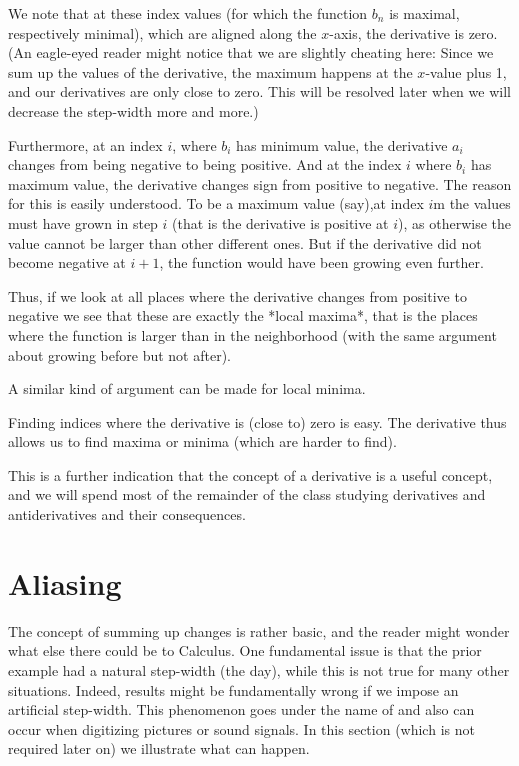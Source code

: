 We note that at these index values (for which the function $b_n$ is maximal,
respectively minimal), which are aligned along the $x$-axis, the derivative
is zero. (An eagle-eyed reader might notice that we are slightly cheating
here: Since we sum up the values of the derivative, the maximum happens at
the $x$-value plus 1, and our derivatives are only close to zero. This will
be resolved later when we will decrease the step-width more and more.)

Furthermore, at an index $i$, where $b_i$ has minimum value, the derivative
$a_i$ changes from being negative to being positive. And at the index $i$
where $b_i$ has maximum value, the derivative changes sign from positive to
negative.  The reason for this is easily understood. To be a maximum value
(say),at index $i$m the values must have grown in step $i$ (that is the
derivative is positive at $i$), as otherwise the value cannot be larger than
other different ones. But if the derivative did not become negative at
$i+1$, the function would have been growing even further.

Thus, if we look at all places where the derivative changes from positive to
negative we see that these are exactly the *local maxima*, that is the
places where the function is larger than in the neighborhood (with the same
argument about growing before but not after).

A similar kind of argument can be made for local minima.

Finding indices where the derivative is (close to) zero is easy. The
derivative thus allows us to find maxima or minima (which are harder to
find).
\smallskip

This is a further indication that the concept of a derivative is a useful
concept, and we will spend most of the remainder of the class studying
derivatives and antiderivatives and their consequences.

\section{Aliasing}

The concept of summing up changes is rather basic, and the reader might
wonder what else there could be to Calculus. One fundamental issue is that
the prior example had a natural step-width (the day), while this is not true
for many other situations. Indeed, results might be fundamentally wrong if
we impose an artificial step-width. This phenomenon goes under the name of
 and also can occur when digitizing pictures or sound
signals. In this section (which is not required later on) we illustrate what
can happen.
\smallskip

